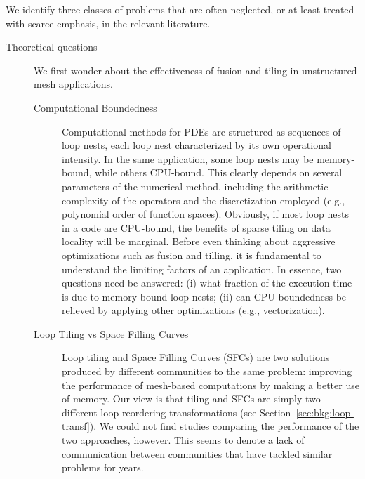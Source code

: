 We identify three classes of problems that are often neglected, or at least treated with scarce emphasis, in the relevant literature. 

\begin{description}
\item[Theoretical questions] We first wonder about the effectiveness of fusion and tiling in unstructured mesh applications.

\begin{description}
\item[Computational Boundedness] Computational methods for PDEs are structured as sequences of loop nests, each loop nest characterized by its own operational intensity. In the same application, some loop nests may be memory-bound, while others CPU-bound. This clearly depends on several parameters of the numerical method, including the arithmetic complexity of the operators and the discretization employed (e.g., polynomial order of function spaces). Obviously, if most loop nests in a code are CPU-bound, the benefits of sparse tiling on data locality will be marginal. Before even thinking about aggressive optimizations such as fusion and tilling, it is fundamental to understand the limiting factors of an application. In essence, two questions need be answered: (i) what fraction of the execution time is due to memory-bound loop nests; (ii) can CPU-boundedness be relieved by applying other optimizations (e.g., vectorization).
\item[Loop Tiling vs Space Filling Curves] Loop tiling and Space Filling Curves (SFCs) are two solutions produced by different communities to the same problem: improving the performance of mesh-based computations by making a better use of memory. Our view is that tiling and SFCs are simply two different loop reordering transformations (see Section~\ref{sec:bkg:loop-transf}). We could not find studies comparing the performance of the two approaches, however. This seems to denote a lack of communication between communities that have tackled similar problems for years.
\end{description}


\end{description}
